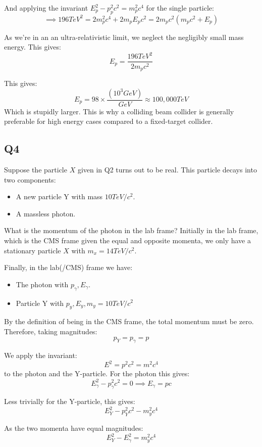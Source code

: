 And applying the invariant $E_p^2 - p_p^2 c^2 = m_p^2 c^4$ for the single particle:
\[
    \implies 196 \si{TeV^2} = 2 m_p^2 c^4 + 2m_p E_p c^2 = 2 m_p c^2 \left(m_p c^2 + E_p\right)
\]

As we're in an an ultra-relativistic limit, we neglect the negligibly small mass energy. This gives:
\[
    E_p = \frac{196 \si{TeV}^2}{2 m_p c^2}
\]

This gives:
\[
    E_p = 98 \times \frac{\left(10^3 \si{GeV}\right)}{GeV} \approx 100,000 \si{TeV}
\]
Which is stupidly larger. This is why a colliding beam collider is generally preferable for high energy cases compared to a fixed-target collider.

\subsection{Q4}
Suppose the particle $X$ given in Q2 turns out to be real. This particle decays into two components:
\begin{itemize}
    \item A new particle Y with mass $10\si{TeV / c^2}$.
    \item A massless photon.
\end{itemize}

What is the momentum of the photon in the lab frame? Initially in the lab frame, which is the CMS frame given the equal and opposite momenta, we only have a stationary particle $X$ with $m_x = 14 \si{TeV/c^2}$.

Finally, in the lab(/CMS) frame we have:
\begin{itemize}
    \item The photon with $p_\gamma, E_\gamma$.
    \item Particle Y with $p_y, E_y, m_y = 10 \si{TeV/c^2}$
\end{itemize}

By the definition of being in the CMS frame, the total momentum must be zero. Therefore, taking magnitudes:
\[
    p_Y = p_\gamma = p
\]

We apply the invariant:
\[
    E^2 = p^2 c^2 = m^2 c^4
\]
to the photon and the Y-particle. For the photon this gives:
\[
    E_\gamma^2 - p_\gamma^2 c^2 = 0 \implies E_\gamma = pc \tag{1}
\]

Less trivially for the Y-particle, this gives:
\[
    E_Y^2 - p_Y^2 c^2 - m_y^2 c^4
\]

As the two momenta have equal magnitudes:
\[
    E_Y^2 - E_\gamma^2 = m_y^2 c^4 \tag{2}
\]

